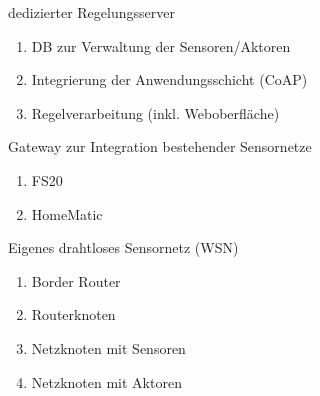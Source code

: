 \begin{frame}{\insertsection}{\insertsubsection}
	\begin{block}{dedizierter Regelungsserver}
		\begin{enumerate}
		\item 	DB zur Verwaltung der Sensoren/Aktoren
		\item 	Integrierung der Anwendungsschicht (CoAP)
		\item 	Regelverarbeitung (inkl. Weboberfläche)
		\end{enumerate}
	\end{block}
	\begin{block}{Gateway zur Integration bestehender Sensornetze}
		\begin{enumerate}
		\item 	FS20
		\item 	HomeMatic
		\end{enumerate}
	\end{block}
	\begin{block}{Eigenes drahtloses Sensornetz (WSN)}
			\begin{enumerate}
			\item 	Border Router
			\item 	Routerknoten
			\item 	Netzknoten mit Sensoren
			\item 	Netzknoten mit Aktoren
			\end{enumerate}
	\end{block}
\end{frame}







